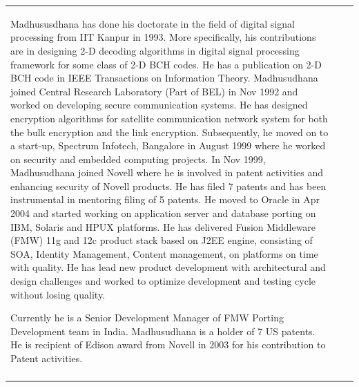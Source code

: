 {\begin{longtable}{V{2.5}p{.95\textwidth}V{2.5}}
\begin{figure}
\vspace{-5pt}
\end{figure}
Madhususdhana has done his doctorate in the field of digital signal processing from IIT Kanpur in 1993. More specifically, his contributions are in designing 2-D decoding algorithms in digital signal processing framework for some class of 2-D BCH codes. He has a publication on 2-D BCH code in IEEE Transactions on Information Theory. Madhusudhana joined Central Research Laboratory (Part of BEL) in Nov 1992 and worked on developing secure communication systems. He has designed encryption algorithms for satellite communication network system for both the bulk encryption and the link encryption. Subsequently, he moved on to a start-up, Spectrum Infotech, Bangalore in August 1999 where he worked on security and embedded computing projects. In Nov 1999, Madhusudhana joined Novell where he is involved in patent activities and enhancing security of Novell products. He has filed 7 patents and has been instrumental in mentoring filing of 5 patents. He moved to Oracle in Apr 2004 and started working on application server and database porting on IBM, Solaris and HPUX platforms. He has delivered Fusion Middleware (FMW) 11g and 12c product stack based on J2EE engine, consisting of SOA, Identity Management, Content management, on platforms on time with quality. He has lead new product development with architectural and design challenges and worked to optimize development and testing cycle without losing quality.

\bigskip

Currently he is a Senior Development Manager of FMW Porting Development team in India.  Madhusudhana  is a holder of 7 US patents. He is recipient of Edison award from Novell in 2003 for his contribution to Patent activities.\\
\end{longtable}}\relax

\vskip 1.5cm

